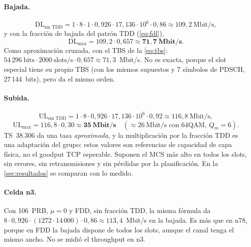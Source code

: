 \paragraph{Bajada.}
\begin{equation}
\text{DL}_\text{sin TDD} = 1\cdot 8\cdot 1\cdot 0{,}926\cdot 17{,}136\cdot 10^6\cdot 0{,}86 \approx 109{,}2~\text{Mbit/s},
\end{equation}
y con la fracción de bajada del patrón TDD (\cref{eq:fdl}),
\begin{equation}
\text{DL}_\text{max} = 109{,}2\cdot 0{,}657 \approx \mathbf{71{,}7~Mbit/s}.
\label{eq:dlmax}
\end{equation}
Como aproximación cruzada, con el TBS de la \cref{eq:tbs}: $54\,296~\text{bits}\cdot 2000~\text{slots/s}\cdot 0{,}657 \approx 71{,}3$~Mbit/s. No es exacta, porque el slot especial tiene su propio TBS (con los mismos supuestos y 7 símbolos de PDSCH, 27\,144~bits), pero da el mismo orden.

\paragraph{Subida.}
\begin{equation}
\text{UL}_\text{sin TDD} = 1\cdot 8\cdot 0{,}926\cdot 17{,}136\cdot 10^6\cdot 0{,}92 \approx 116{,}8~\text{Mbit/s},
\end{equation}
\begin{equation}
\text{UL}_\text{max} = 116{,}8\cdot 0{,}30 \approx \mathbf{35~Mbit/s}\quad(\approx 26~\text{Mbit/s con 64QAM, } Q_m = 6).
\label{eq:ulmax}
\end{equation}
TS~38.306 da una tasa \emph{aproximada}, y la multiplicación por la fracción TDD es una adaptación del grupo: estos valores son referencias de capacidad de capa física, no el goodput TCP esperable. Suponen el MCS más alto en todos los slots, sin errores, sin retransmisiones y sin pérdidas por la planificación. En la \cref{sec:resultados} se comparan con lo medido.

\paragraph{Celda n3.} Con 106~PRB, $\mu=0$ y FDD, sin fracción TDD, la misma fórmula da $8\cdot 0{,}926\cdot (1272\cdot 14\,000)\cdot 0{,}86 \approx 113{,}4$~Mbit/s en la bajada. Es más que en n78, porque en FDD la bajada dispone de todos los slots, aunque el canal tenga el mismo ancho. No se midió el throughput en n3.

